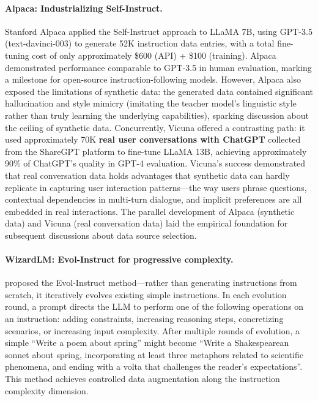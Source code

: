 \paragraph{Alpaca: Industrializing Self-Instruct.}
Stanford Alpaca \citep{taori2023alpaca} applied the Self-Instruct approach to LLaMA 7B,
using GPT-3.5 (text-davinci-003) to generate 52K instruction data entries,
with a total fine-tuning cost of only approximately \$600 (API) + \$100 (training).
Alpaca demonstrated performance comparable to GPT-3.5 in human evaluation,
marking a milestone for open-source instruction-following models.
However, Alpaca also exposed the limitations of synthetic data:
the generated data contained significant hallucination and style mimicry (imitating the teacher model's linguistic style
rather than truly learning the underlying capabilities), sparking discussion about the ceiling of synthetic data.
Concurrently, Vicuna \citep{chiang2023vicuna} offered a contrasting path:
it used approximately 70K \textbf{real user conversations with ChatGPT} collected from the ShareGPT platform
to fine-tune LLaMA 13B, achieving approximately 90\% of ChatGPT's quality in GPT-4 evaluation.
Vicuna's success demonstrated that real conversation data holds advantages
that synthetic data can hardly replicate in capturing user interaction patterns---the way users phrase questions, contextual dependencies in multi-turn dialogue,
and implicit preferences are all embedded in real interactions.
The parallel development of Alpaca (synthetic data) and Vicuna (real conversation data)
laid the empirical foundation for subsequent discussions about data source selection.

\paragraph{WizardLM: Evol-Instruct for progressive complexity.}
\citet{xu2024wizardlm} proposed the Evol-Instruct method---rather
than generating instructions from scratch, it iteratively evolves existing simple instructions.
In each evolution round, a prompt directs the LLM to perform one of the following operations on an instruction:
adding constraints, increasing reasoning steps, concretizing scenarios, or increasing input complexity.
After multiple rounds of evolution, a simple ``Write a poem about spring'' might become
``Write a Shakespearean sonnet about spring, incorporating at least three
metaphors related to scientific phenomena, and ending with a volta
that challenges the reader's expectations''.
This method achieves controlled data augmentation along the instruction complexity dimension.

